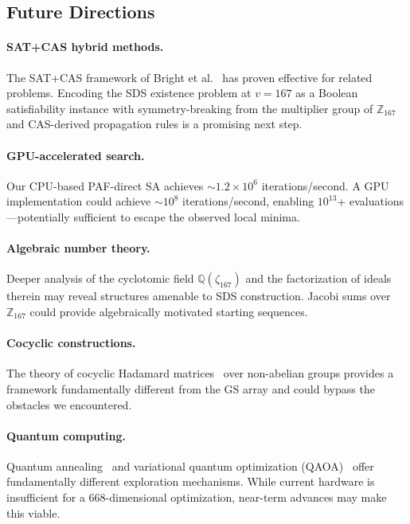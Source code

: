 \documentclass[11pt,a4paper]{article}
\newcommand{\ZZ}{\mathbb{Z}}
\newcommand{\QQ}{\mathbb{Q}}
\begin{document}
\subsection{Future Directions}

\paragraph{SAT+CAS hybrid methods.}
The SAT+CAS framework of Bright et
al.~\cite{bright2019sat,bright2019aaai} has proven effective for
related problems.  Encoding the SDS existence problem at $v = 167$ as a
Boolean satisfiability instance with symmetry-breaking from the multiplier
group of $\ZZ_{167}$ and CAS-derived propagation rules is a promising
next step.

\paragraph{GPU-accelerated search.}
Our CPU-based PAF-direct SA achieves $\sim\!1.2 \times 10^6$
iterations/second.  A GPU implementation could achieve $\sim\!10^8$
iterations/second, enabling $10^{13}$+ evaluations---potentially
sufficient to escape the observed local minima.

\paragraph{Algebraic number theory.}
Deeper analysis of the cyclotomic field $\QQ(\zeta_{167})$ and the
factorization of ideals therein may reveal structures amenable to SDS
construction.  Jacobi sums over $\ZZ_{167}$ could provide algebraically
motivated starting sequences.

\paragraph{Cocyclic constructions.}
The theory of cocyclic Hadamard
matrices~\cite{delauney2011flannery,horadam2007hadamard} over non-abelian
groups provides a framework fundamentally different from the GS array and
could bypass the obstacles we encountered.

\paragraph{Quantum computing.}
Quantum annealing~\cite{suksmono2018quantum,suksmono2019quantum} and
variational quantum optimization
(QAOA)~\cite{suksmono2025qaoa} offer fundamentally different
exploration mechanisms.  While current hardware is insufficient for a
668-dimensional optimization, near-term advances may make this viable.
\end{document}
